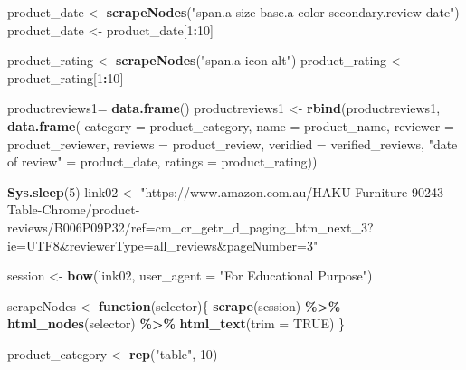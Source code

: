 \documentclass[
]{article}
\newenvironment{Shaded}{\begin{snugshade}}{\end{snugshade}}
\newcommand{\AttributeTok}[1]{\textcolor[rgb]{0.13,0.29,0.53}{#1}}
\newcommand{\ConstantTok}[1]{\textcolor[rgb]{0.56,0.35,0.01}{#1}}
\newcommand{\ControlFlowTok}[1]{\textcolor[rgb]{0.13,0.29,0.53}{\textbf{#1}}}
\newcommand{\DecValTok}[1]{\textcolor[rgb]{0.00,0.00,0.81}{#1}}
\newcommand{\FunctionTok}[1]{\textcolor[rgb]{0.13,0.29,0.53}{\textbf{#1}}}
\newcommand{\NormalTok}[1]{#1}
\newcommand{\OtherTok}[1]{\textcolor[rgb]{0.56,0.35,0.01}{#1}}
\newcommand{\SpecialCharTok}[1]{\textcolor[rgb]{0.81,0.36,0.00}{\textbf{#1}}}
\newcommand{\StringTok}[1]{\textcolor[rgb]{0.31,0.60,0.02}{#1}}
\begin{document}
\begin{Shaded}
\begin{Highlighting}[]
\NormalTok{  product\_date }\OtherTok{\textless{}{-}} \FunctionTok{scrapeNodes}\NormalTok{(}\StringTok{"span.a{-}size{-}base.a{-}color{-}secondary.review{-}date"}\NormalTok{)}
\NormalTok{  product\_date }\OtherTok{\textless{}{-}}\NormalTok{ product\_date[}\DecValTok{1}\SpecialCharTok{:}\DecValTok{10}\NormalTok{]}
  
\NormalTok{  product\_rating }\OtherTok{\textless{}{-}} \FunctionTok{scrapeNodes}\NormalTok{(}\StringTok{"span.a{-}icon{-}alt"}\NormalTok{)}
\NormalTok{  product\_rating }\OtherTok{\textless{}{-}}\NormalTok{ product\_rating[}\DecValTok{1}\SpecialCharTok{:}\DecValTok{10}\NormalTok{]}
  
\NormalTok{  productreviews1}\OtherTok{=} \FunctionTok{data.frame}\NormalTok{()}
\NormalTok{  productreviews1 }\OtherTok{\textless{}{-}} \FunctionTok{rbind}\NormalTok{(productreviews1, }\FunctionTok{data.frame}\NormalTok{(}
                      \AttributeTok{category =}\NormalTok{ product\_category,}
                      \AttributeTok{name =}\NormalTok{ product\_name,}
                      \AttributeTok{reviewer =}\NormalTok{ product\_reviewer,}
                      \AttributeTok{reviews =}\NormalTok{ product\_review,}
                      \AttributeTok{veridied =}\NormalTok{ verified\_reviews,}
                      \StringTok{"date of review"} \OtherTok{=}\NormalTok{ product\_date,}
                      \AttributeTok{ratings =}\NormalTok{ product\_rating))}

  
 \FunctionTok{Sys.sleep}\NormalTok{(}\DecValTok{5}\NormalTok{)}
\NormalTok{link02 }\OtherTok{\textless{}{-}} \StringTok{"https://www.amazon.com.au/HAKU{-}Furniture{-}90243{-}Table{-}Chrome/product{-}reviews/B006P09P32/ref=cm\_cr\_getr\_d\_paging\_btm\_next\_3?ie=UTF8\&reviewerType=all\_reviews\&pageNumber=3"}


\NormalTok{  session }\OtherTok{\textless{}{-}} \FunctionTok{bow}\NormalTok{(link02,}
               \AttributeTok{user\_agent =} \StringTok{"For Educational Purpose"}\NormalTok{)}

\NormalTok{  scrapeNodes }\OtherTok{\textless{}{-}} \ControlFlowTok{function}\NormalTok{(selector)\{}
    \FunctionTok{scrape}\NormalTok{(session) }\SpecialCharTok{\%\textgreater{}\%}
      \FunctionTok{html\_nodes}\NormalTok{(selector) }\SpecialCharTok{\%\textgreater{}\%}
      \FunctionTok{html\_text}\NormalTok{(}\AttributeTok{trim =} \ConstantTok{TRUE}\NormalTok{)}
\NormalTok{  \}}

\NormalTok{  product\_category }\OtherTok{\textless{}{-}} \FunctionTok{rep}\NormalTok{(}\StringTok{"table"}\NormalTok{, }\DecValTok{10}\NormalTok{)}


\end{Highlighting}
\end{Shaded}
\end{document}
